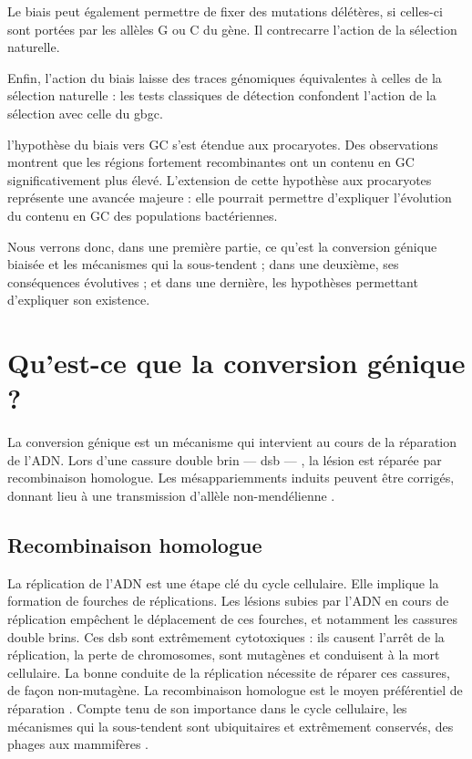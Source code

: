 \documentclass[11pt, oneside]{scrartcl}
\begin{document}
Le biais peut également permettre de fixer des mutations délétères, si celles-ci
sont portées par les allèles G ou C du gène. Il contrecarre l'action de la
sélection naturelle\cite{galtier_gc-biased_2009, galtier_adaptation_2007}.

Enfin, l'action du biais laisse des traces génomiques équivalentes à celles de
la sélection naturelle : les tests classiques de détection confondent l'action
de la sélection avec celle du \ac{gbgc}\cite{ratnakumar_detecting_2010}.


 l'hypothèse du biais vers GC s'est étendue aux
procaryotes. Des observations montrent que les régions fortement recombinantes
ont un contenu en GC significativement plus élevé. L'extension de cette
hypothèse aux procaryotes représente une avancée majeure : elle pourrait
permettre d'expliquer l'évolution du contenu en GC des populations bactériennes.

Nous verrons donc, dans une première partie, ce qu'est la conversion génique
biaisée et les mécanismes qui la sous-tendent ; dans une deuxième, ses
conséquences évolutives ; et dans une dernière, les hypothèses permettant
d'expliquer son existence.

\section{Qu'est-ce que la conversion génique ?}
\label{sec:orgheadline8}

La conversion génique est un mécanisme qui intervient au cours de la réparation
de l'ADN. Lors d'une cassure double brin --- \ac{dsb} --- , la lésion est réparée par
recombinaison homologue. Les mésappariemments induits peuvent être corrigés,
donnant lieu à une transmission d'allèle non-mendélienne \cite{chen_mechanism_2008}. 

\subsection{Recombinaison homologue}
\label{sec:orgheadline6}

La réplication de l'ADN est une étape clé du cycle cellulaire. Elle implique la
formation de fourches de réplications. Les lésions subies par l'ADN en cours de
réplication empêchent le déplacement de ces fourches, et notamment les cassures
double brins. Ces \ac{dsb} sont extrêmement cytotoxiques : ils causent l'arrêt
de la réplication, la perte de chromosomes, sont mutagènes et conduisent à la
mort cellulaire\cite{watson_molecular_2014}. La bonne conduite de la réplication
nécessite de réparer ces cassures, de façon non-mutagène. La recombinaison
homologue est le moyen préférentiel de réparation \cite{lusetti_bacterial_2002}.
Compte tenu de son importance dans le cycle cellulaire, les mécanismes qui la
sous-tendent sont ubiquitaires et extrêmement conservés, des phages aux
mammifères \cite{cromie_recombination_2001}.
\end{document}
